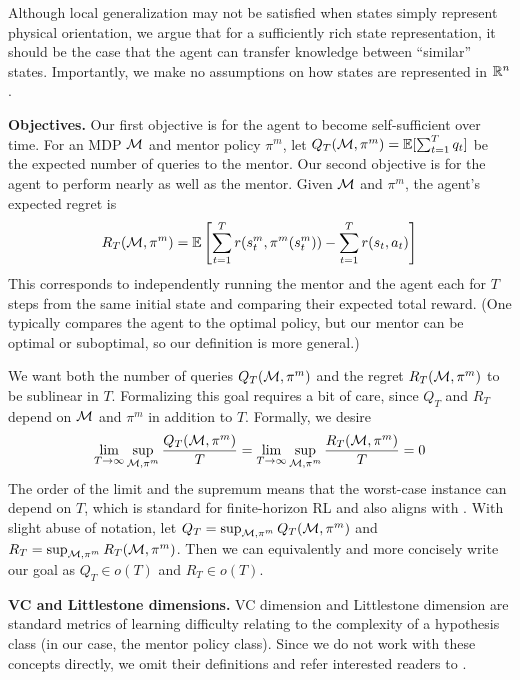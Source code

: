 Although local generalization may not be satisfied when states simply represent physical orientation, we argue that for a sufficiently rich state representation, it should be the case that the agent can transfer knowledge between ``similar'' states. Importantly, we make no assumptions on how states are represented in $\mathbb{R}^n$.

\textbf{Objectives.} Our first objective is for the agent to become self-sufficient over time. For an MDP $\mathcal{M}$ and mentor policy $\pi^m$, let $Q_T(\mathcal{M}, \pi^m) = \operatorname*{\mathbb{E}}[\sum_{t=1}^T q_t]$ be the expected number of queries to the mentor. Our second objective is for the agent to perform nearly as well as the mentor. Given $\mathcal{M}$ and $\pi^m$, the agent's expected regret is
\[
R_T(\mathcal{M}, \pi^m) = \operatorname*{\mathbb{E}}\left[\sum_{t=1}^T r(s_t^m, \pi^m(s_t^m) )- \sum_{t=1}^T r(s_t, a_t)\right]
\]
This corresponds to independently running the mentor and the agent each for $T$ steps from the same initial state and comparing their expected total reward. (One typically compares the agent to the optimal policy, but our mentor can be optimal or suboptimal, so our definition is more general.)

We want both the number of queries $Q_T(\mathcal{M},\pi^m)$ and the regret $R_T(\mathcal{M}, \pi^m)$ to be sublinear in $T$. Formalizing this goal requires a bit of care, since $Q_T$ and $R_T$ depend on $\mathcal{M}$ and $\pi^m$ in addition to $T$. Formally, we desire
\[
\lim_{T\to\infty} \sup_{\mathcal{M}, \pi^m} \frac{Q_T(\mathcal{M}, \pi^m)}{T} = \lim_{T\to\infty} \sup_{\mathcal{M}, \pi^m} \frac{R_T(\mathcal{M}, \pi^m)}{T} = 0
\]
The order of the limit and the supremum means that the worst-case instance can depend on $T$, which is standard for finite-horizon RL and also aligns with \citet{plaut_avoiding_2024}. With slight abuse of notation, let $Q_T = \sup_{\mathcal{M}, \pi^m} Q_T(\mathcal{M}, \pi^m)$ and $R_T = \sup_{\mathcal{M}, \pi^m} 
 R_T(\mathcal{M}, \pi^m)$. Then we can equivalently and more concisely write our goal as $Q_T \in o(T)$ and $R_T \in o(T)$.

 \textbf{VC and Littlestone dimensions.} VC dimension \citep{vapnik_uniform_1971} and Littlestone dimension \citep{littlestone1988learning} are standard metrics of learning difficulty relating to the complexity of a hypothesis class (in our case, the mentor policy class). Since we do not work with these concepts directly, we omit their definitions and refer interested readers to \citet{shalev-shwartz_understanding_2014}.



